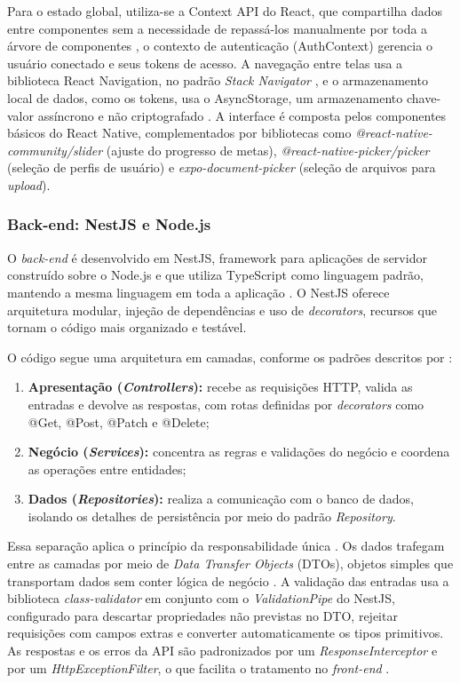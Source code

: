 Para o estado global, utiliza-se a Context API do React, que compartilha dados entre componentes sem a necessidade de repassá-los manualmente por toda a árvore de componentes \citep{react2023}, o contexto de autenticação (AuthContext) gerencia o usuário conectado e seus tokens de acesso. A navegação entre telas usa a biblioteca React Navigation, no padrão \textit{Stack Navigator} \citep{reactnavigation2023}, e o armazenamento local de dados, como os tokens, usa o AsyncStorage, um armazenamento chave-valor assíncrono e não criptografado \citep{reactnative2023}. A interface é composta pelos componentes básicos do React Native, complementados por bibliotecas como \textit{@react-native-community/slider} (ajuste do progresso de metas), \textit{@react-native-picker/picker} (seleção de perfis de usuário) e \textit{expo-document-picker} (seleção de arquivos para \textit{upload}).

\subsubsection{Back-end: NestJS e Node.js}

O \textit{back-end} é desenvolvido em NestJS, framework para aplicações de servidor construído sobre o Node.js e que utiliza TypeScript como linguagem padrão, mantendo a mesma linguagem em toda a aplicação \citep{nestjs2023}. O NestJS oferece arquitetura modular, injeção de dependências e uso de \textit{decorators}, recursos que tornam o código mais organizado e testável.

O código segue uma arquitetura em camadas, conforme os padrões descritos por \citet{fowler2002}:

\begin{enumerate}
    \item \textbf{Apresentação (\textit{Controllers}):} recebe as requisições HTTP, valida as entradas e devolve as respostas, com rotas definidas por \textit{decorators} como @Get, @Post, @Patch e @Delete;
    \item \textbf{Negócio (\textit{Services}):} concentra as regras e validações do negócio e coordena as operações entre entidades;
    \item \textbf{Dados (\textit{Repositories}):} realiza a comunicação com o banco de dados, isolando os detalhes de persistência por meio do padrão \textit{Repository}.
\end{enumerate}

Essa separação aplica o princípio da responsabilidade única \citep{martin2008}. Os dados trafegam entre as camadas por meio de \textit{Data Transfer Objects} (DTOs), objetos simples que transportam dados sem conter lógica de negócio \citep{fowler2002}. A validação das entradas usa a biblioteca \textit{class-validator} em conjunto com o \textit{ValidationPipe} do NestJS, configurado para descartar propriedades não previstas no DTO, rejeitar requisições com campos extras e converter automaticamente os tipos primitivos. As respostas e os erros da API são padronizados por um \textit{ResponseInterceptor} e por um \textit{HttpExceptionFilter}, o que facilita o tratamento no \textit{front-end} \citep{nestjs2023}.

